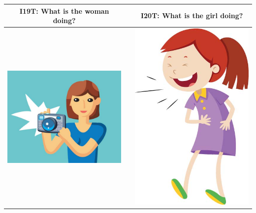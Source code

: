 \documentclass[12pt,notitlepage]{article}
\begin{document}
\begin{center}
\begin{tabular}{|c|c|c|}
\hline
I19T: What is the woman doing? && I20T: What is the girl doing? \\
\hline
\includegraphics[width=20em,trim=0 0 0 -3]{figures/I19.jpg} & & \includegraphics[width=20em,trim=0 0 0 -3]{figures/I20.jpg} \\
\hline
\end{tabular}
\vspace{1em} \\



\end{center}
\end{document}
